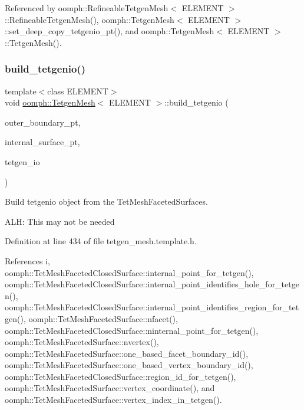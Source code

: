 Referenced by oomph\+::\+Refineable\+Tetgen\+Mesh$<$ E\+L\+E\+M\+E\+N\+T $>$\+::\+Refineable\+Tetgen\+Mesh(), oomph\+::\+Tetgen\+Mesh$<$ E\+L\+E\+M\+E\+N\+T $>$\+::set\+\_\+deep\+\_\+copy\+\_\+tetgenio\+\_\+pt(), and oomph\+::\+Tetgen\+Mesh$<$ E\+L\+E\+M\+E\+N\+T $>$\+::\+Tetgen\+Mesh().

\mbox{\label{classoomph_1_1TetgenMesh_a5a805a008ca5ae48af1aaae06de092b1}} 
\subsubsection{\texorpdfstring{build\+\_\+tetgenio()}{build\_tetgenio()}}
{\footnotesize\ttfamily template$<$class E\+L\+E\+M\+E\+NT$>$ \\
void \hyperlink{classoomph_1_1TetgenMesh}{oomph\+::\+Tetgen\+Mesh}$<$ E\+L\+E\+M\+E\+NT $>$\+::build\+\_\+tetgenio (\begin{DoxyParamCaption}\item[{\hyperlink{classoomph_1_1TetMeshFacetedSurface}{Tet\+Mesh\+Faceted\+Surface} $\ast$const \&}]{outer\+\_\+boundary\+\_\+pt,  }\item[{\hyperlink{classoomph_1_1Vector}{Vector}$<$ \hyperlink{classoomph_1_1TetMeshFacetedSurface}{Tet\+Mesh\+Faceted\+Surface} $\ast$$>$ \&}]{internal\+\_\+surface\+\_\+pt,  }\item[{tetgenio \&}]{tetgen\+\_\+io }\end{DoxyParamCaption})\hspace{0.3cm}{\ttfamily [inline]}}



Build tetgenio object from the Tet\+Mesh\+Faceted\+Surfaces. 

A\+LH\+: This may not be needed 

Definition at line 434 of file tetgen\+\_\+mesh.\+template.\+h.



References i, oomph\+::\+Tet\+Mesh\+Faceted\+Closed\+Surface\+::internal\+\_\+point\+\_\+for\+\_\+tetgen(), oomph\+::\+Tet\+Mesh\+Faceted\+Closed\+Surface\+::internal\+\_\+point\+\_\+identifies\+\_\+hole\+\_\+for\+\_\+tetgen(), oomph\+::\+Tet\+Mesh\+Faceted\+Closed\+Surface\+::internal\+\_\+point\+\_\+identifies\+\_\+region\+\_\+for\+\_\+tetgen(), oomph\+::\+Tet\+Mesh\+Faceted\+Surface\+::nfacet(), oomph\+::\+Tet\+Mesh\+Faceted\+Closed\+Surface\+::ninternal\+\_\+point\+\_\+for\+\_\+tetgen(), oomph\+::\+Tet\+Mesh\+Faceted\+Surface\+::nvertex(), oomph\+::\+Tet\+Mesh\+Faceted\+Surface\+::one\+\_\+based\+\_\+facet\+\_\+boundary\+\_\+id(), oomph\+::\+Tet\+Mesh\+Faceted\+Surface\+::one\+\_\+based\+\_\+vertex\+\_\+boundary\+\_\+id(), oomph\+::\+Tet\+Mesh\+Faceted\+Closed\+Surface\+::region\+\_\+id\+\_\+for\+\_\+tetgen(), oomph\+::\+Tet\+Mesh\+Faceted\+Surface\+::vertex\+\_\+coordinate(), and oomph\+::\+Tet\+Mesh\+Faceted\+Surface\+::vertex\+\_\+index\+\_\+in\+\_\+tetgen().




